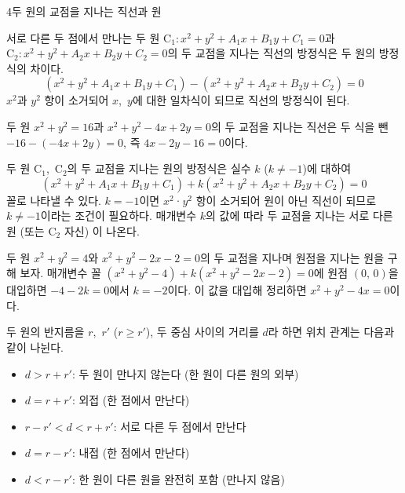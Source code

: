 \documentclass[10pt]{article}
\begin{document}
\begin{dmconcept}{4}{두 원의 교점을 지나는 직선과 원}
\setlength{\parskip}{0.8mm plus 0.9mm minus 0mm}\linespread{1.12}\selectfont%


서로 다른 두 점에서 만나는 두 원 $\mathrm{C}_1 : x^2 + y^2 + A_1 x + B_1 y + C_1 = 0$과 $\mathrm{C}_2 : x^2 + y^2 + A_2 x + B_2 y + C_2 = 0$의 두 교점을 지나는 직선의 방정식은 두 원의 방정식의 차이다.
\begin{equation*}
  (x^2 + y^2 + A_1 x + B_1 y + C_1) - (x^2 + y^2 + A_2 x + B_2 y + C_2) = 0
\end{equation*}
$x^2$과 $y^2$ 항이 소거되어 $x$,\ $y$에 대한 일차식이 되므로 직선의 방정식이 된다.

\begin{dmexample}
두 원 $x^2 + y^2 = 16$과 $x^2 + y^2 - 4x + 2y = 0$의 두 교점을 지나는 직선은 두 식을 뺀 $-16 - (-4x + 2y) = 0$, 즉 $4x - 2y - 16 = 0$이다.
\end{dmexample}


두 원 $\mathrm{C}_1$,\ $\mathrm{C}_2$의 두 교점을 지나는 원의 방정식은 실수 $k$ ($k \ne -1$)에 대하여
\begin{equation*}
  (x^2 + y^2 + A_1 x + B_1 y + C_1) + k(x^2 + y^2 + A_2 x + B_2 y + C_2) = 0
\end{equation*}
꼴로 나타낼 수 있다. $k = -1$이면 $x^2$·$y^2$ 항이 소거되어 원이 아닌 직선이 되므로 $k \ne -1$이라는 조건이 필요하다. 매개변수 $k$의 값에 따라 두 교점을 지나는 서로 다른 원 (또는 $\mathrm{C}_2$ 자신) 이 나온다.

\begin{dmexample}
두 원 $x^2 + y^2 = 4$와 $x^2 + y^2 - 2x - 2 = 0$의 두 교점을 지나며 원점을 지나는 원을 구해 보자. 매개변수 꼴 $(x^2 + y^2 - 4) + k(x^2 + y^2 - 2x - 2) = 0$에 원점 $(0,\, 0)$을 대입하면 $-4 - 2k = 0$에서 $k = -2$이다. 이 값을 대입해 정리하면 $x^2 + y^2 - 4x = 0$이다.
\end{dmexample}


두 원의 반지름을 $r$,\ $r'$ ($r \ge r'$), 두 중심 사이의 거리를 $d$라 하면 위치 관계는 다음과 같이 나뉜다.
\begin{itemize}[leftmargin=8mm, itemsep=0.5mm, topsep=1mm]
  \item $d > r + r'$: 두 원이 만나지 않는다 (한 원이 다른 원의 외부)
  \item $d = r + r'$: 외접 (한 점에서 만난다)
  \item $r - r' < d < r + r'$: 서로 다른 두 점에서 만난다
  \item $d = r - r'$: 내접 (한 점에서 만난다)
  \item $d < r - r'$: 한 원이 다른 원을 완전히 포함 (만나지 않음)
\end{itemize}


\end{dmconcept}
\end{document}
